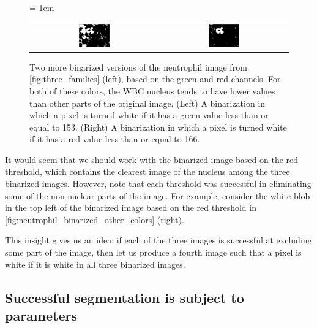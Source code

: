 \begin{figure}[h]
\centering
 \tabcolsep = 1em
\mySfFamily
\begin{tabular}{c c}
\includegraphics[width = 0.25\textwidth]{../images/neutrophil_binarized_green.png} & \includegraphics[width = 0.25\textwidth]{../images/neutrophil_binarized_red.png}
\end{tabular}
\caption{Two more binarized versions of the neutrophil image from \autoref{fig:three_families} (left), based on the green and red channels. For both of these colors, the WBC nucleus tends to have lower values than other parts of the original image. (Left) A binarization in which a pixel is turned white if it has a green value less than or equal to 153. (Right) A binarization in which a pixel is turned white if it has a red value less than or equal to 166.}
\label{fig:neutrophil_binarized_other_colors}
\end{figure}

It would seem that we should work with the binarized image based on the red threshold, which contains the clearest image of the nucleus among the three binarized images. However, note that each threshold was successful in eliminating some of the non-nuclear parts of the image. For example, consider the white blob in the top left of the binarized image based on the red threshold in \autoref{fig:neutrophil_binarized_other_colors} (right).

This insight gives us an idea: if each of the three images is successful at excluding some part of the image, then let us produce a fourth image such that a pixel is white if it is white in all three binarized images.

\FloatBarrier
{}
\subsection{Successful segmentation is subject to parameters}

